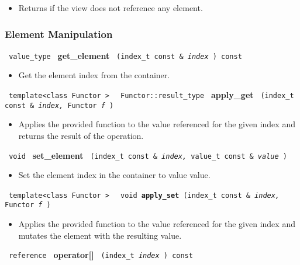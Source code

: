 \begin{itemize}
\item
Returns if the view does not reference any element.
\end{itemize}

\subsubsection{ Element Manipulation}

\noindent
\texttt{%
value\_type
}
\newline
\textbf{get\_element}%
\texttt{%
(index\_t const \&
\textit{index}%
) const
}

\begin{itemize}
\item
Get the element index from the container.
\end{itemize}

\noindent
\texttt{%
template<class Functor >
}
\texttt{%
Functor::result\_type
}
\newline
\textbf{apply\_get}%
\texttt{%
(index\_t const \&
\textit{index,}%
Functor
\textit{f}%
)
}

\begin{itemize}
\item
Applies the provided function to the value referenced for the given index and returns the result of the operation.
\end{itemize}

\noindent
\texttt{%
void
}
\newline
\textbf{set\_element}%
\texttt{%
(index\_t const \&
\textit{index,}%
value\_t const \&
\textit{value}%
)
}

\begin{itemize}
\item
Set the element index in the container to value value.
\end{itemize}

\noindent
\texttt{%
template<class Functor >
}
\texttt{%
void
\newline
\textbf{apply\_set}%
(index\_t const \&
\textit{index,}%
Functor
\textit{f}%
)
}

\begin{itemize}
\item
Applies the provided function to the value referenced for the given index and mutates the element with the resulting value.
\end{itemize}

\noindent
\texttt{%
reference
}
\newline
\textbf{operator[]}%
\texttt{%
(index\_t
\textit{index}%
) const
}

